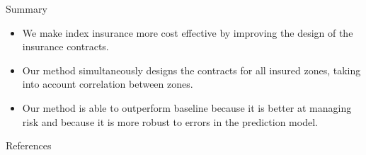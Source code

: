 \documentclass{beamer}
\begin{document}

\begin{frame}{Summary}
    \begin{itemize}
        \setlength\itemsep{1.5em}
        \item We make index insurance more cost effective by improving the design of the insurance contracts. 
        \item Our method simultaneously designs the contracts for all insured zones, taking into account correlation between zones.
        \item Our method is able to outperform baseline because it is better at managing risk and because it is more robust to errors in the prediction model. 
    \end{itemize}
    
\end{frame}







\begin{frame}{References}
\printbibliography
\end{frame}
\end{document}
